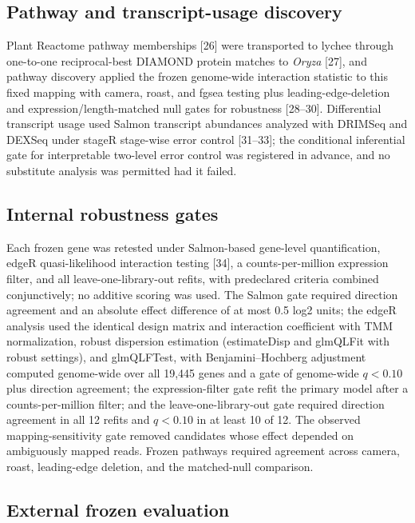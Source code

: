 \documentclass[11pt]{article}
\newcommand{\q}{\textit{q}}
\begin{document}
\subsection{Pathway and transcript-usage discovery}

Plant Reactome pathway memberships [26] were transported to lychee through one-to-one reciprocal-best DIAMOND protein matches to \textit{Oryza} [27], and pathway discovery applied the frozen genome-wide interaction statistic to this fixed mapping with camera, roast, and fgsea testing plus leading-edge-deletion and expression/length-matched null gates for robustness [28--30]. Differential transcript usage used Salmon transcript abundances analyzed with DRIMSeq and DEXSeq under stageR stage-wise error control [31--33]; the conditional inferential gate for interpretable two-level error control was registered in advance, and no substitute analysis was permitted had it failed.

\subsection{Internal robustness gates}

Each frozen gene was retested under Salmon-based gene-level quantification, edgeR quasi-likelihood interaction testing [34], a counts-per-million expression filter, and all leave-one-library-out refits, with predeclared criteria combined conjunctively; no additive scoring was used. The Salmon gate required direction agreement and an absolute effect difference of at most 0.5 log2 units; the edgeR analysis used the identical design matrix and interaction coefficient with TMM normalization, robust dispersion estimation (estimateDisp and glmQLFit with robust settings), and glmQLFTest, with Benjamini--Hochberg adjustment computed genome-wide over all 19,445 genes and a gate of genome-wide $\q<0.10$ plus direction agreement; the expression-filter gate refit the primary model after a counts-per-million filter; and the leave-one-library-out gate required direction agreement in all 12 refits and $\q<0.10$ in at least 10 of 12. The observed mapping-sensitivity gate removed candidates whose effect depended on ambiguously mapped reads. Frozen pathways required agreement across camera, roast, leading-edge deletion, and the matched-null comparison.

\subsection{External frozen evaluation}
\end{document}
